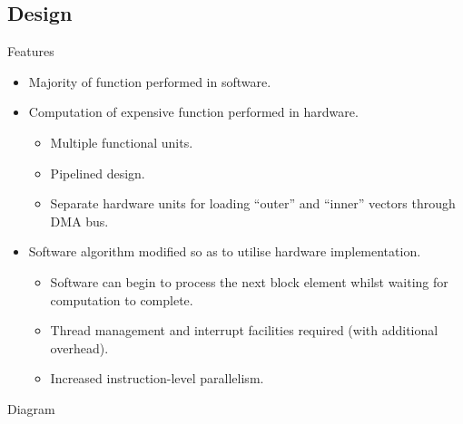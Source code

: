 \subsection{Design}
\begin{frame}[label=design]{Features}
    \begin{itemize}
        \item Majority of  function performed
            in software.

        \item Computation of expensive  function
            performed in hardware.
        \begin{itemize}
            \item Multiple functional units.
            \item Pipelined design.
            \item Separate hardware units for loading ``outer'' and ``inner''
                vectors through DMA bus.
        \end{itemize}

        \item Software algorithm modified so as to utilise hardware
            implementation.
        \begin{itemize}
            \item Software can begin to process the next block element whilst
                waiting for  computation to complete.
            \item Thread management and interrupt facilities required (with
                additional overhead).
            \item Increased instruction-level parallelism.
        \end{itemize}
    \end{itemize}
\end{frame}

\begin{frame}[label=design-diagram]{Diagram}

\end{frame}

